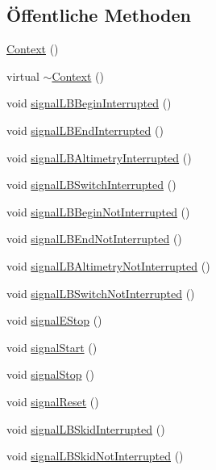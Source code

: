 \subsection*{Öffentliche Methoden}
\begin{DoxyCompactItemize}
\item 
\hyperlink{class_context_a652cdcd2eedc8dbd9110bd284c5d5cf0}{Context} ()
\item 
virtual \hyperlink{class_context_a2d34e4556448e40693f61d15e091b604}{$\sim$\+Context} ()
\item 
void \hyperlink{class_context_a08df75859b851d2eca2d8e379214d6b5}{signal\+L\+B\+Begin\+Interrupted} ()
\item 
void \hyperlink{class_context_a9e9d5d85cafe8b295193f01fd2b7a8ee}{signal\+L\+B\+End\+Interrupted} ()
\item 
void \hyperlink{class_context_af78ea1902addcf137e8e7d99431592c6}{signal\+L\+B\+Altimetry\+Interrupted} ()
\item 
void \hyperlink{class_context_afdd121a466cf690038ede9b8c2a04160}{signal\+L\+B\+Switch\+Interrupted} ()
\item 
void \hyperlink{class_context_a9528945480d5072126031a6ce0d20b99}{signal\+L\+B\+Begin\+Not\+Interrupted} ()
\item 
void \hyperlink{class_context_a6debf81836f13909119658b40e32fe1c}{signal\+L\+B\+End\+Not\+Interrupted} ()
\item 
void \hyperlink{class_context_acf97db4d70e7246a1d06e4166ece5de5}{signal\+L\+B\+Altimetry\+Not\+Interrupted} ()
\item 
void \hyperlink{class_context_a4fd603eec47acc8a3671b7bdd3bdfe6d}{signal\+L\+B\+Switch\+Not\+Interrupted} ()
\item 
void \hyperlink{class_context_a18bc1a709e3db9477e133f545f7cf66a}{signal\+E\+Stop} ()
\item 
void \hyperlink{class_context_a9fbe4299614bae2f11e92ed56cde640c}{signal\+Start} ()
\item 
void \hyperlink{class_context_ac729f3e2184382006588a438622f235f}{signal\+Stop} ()
\item 
void \hyperlink{class_context_a59ea683658907374dbe23125c11b1e93}{signal\+Reset} ()
\item 
void \hyperlink{class_context_a41c95a05dffe3e6d89ebe5a6522e3a6a}{signal\+L\+B\+Skid\+Interrupted} ()
\item 
void \hyperlink{class_context_a54d07729fce18877b7fa671e5622c2cd}{signal\+L\+B\+Skid\+Not\+Interrupted} ()
\item 

\end{DoxyCompactItemize}
